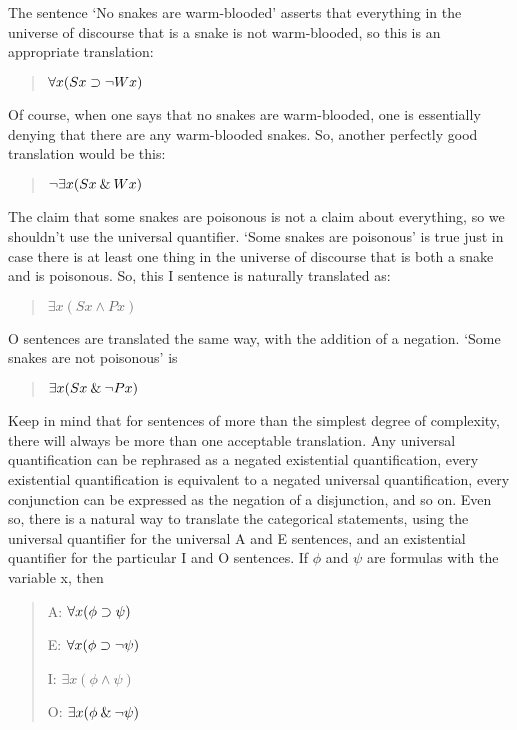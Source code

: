 \documentclass[../logic-text.tex]{subfiles}
\begin{document}
The sentence \enquote*{No snakes are warm-blooded} asserts that everything in the universe of discourse that is a snake is not warm-blooded, so this is an appropriate translation:


\begin{quote}
  \(\forall x(Sx \supset \neg Wx)\)
\end{quote}

Of course, when one says that no snakes are warm-blooded, one is essentially denying that there are any warm-blooded snakes.
So, another perfectly good translation would be this:

\begin{quote}
  \(\neg \exists x( Sx \mathbin{\&} Wx)\)
\end{quote}

The claim that some snakes are poisonous is not a claim about everything, so we shouldn't use the universal quantifier.
\enquote*{Some snakes are poisonous} is true just in case there is at least one thing in the universe of discourse that is both a snake and is poisonous.
So, this I sentence is naturally translated as:

\begin{quote}
  \(\exists x(Sx \land Px)\)
\end{quote}

\noindent O sentences are translated the same way, with the addition of a negation.
\enquote*{Some snakes are not poisonous} is

\begin{quote}
  \(\exists x(Sx \mathbin{\&} \neg Px)\)
\end{quote}

Keep in mind that for sentences of more than the simplest degree of complexity, there will always be more than one acceptable translation.
Any universal quantification can be rephrased as a negated existential quantification, every existential quantification is equivalent to a negated universal quantification, every conjunction can be expressed as the negation of a disjunction, and so on.
Even so, there is a natural way to translate the categorical statements, using the universal quantifier for the universal A and E sentences, and an existential quantifier for the particular I and O sentences.
If \(\phi\) and \(\psi\) are formulas with the variable x, then

\begin{quote}
  A: \(\forall x(\phi \supset \psi)\)

  E: \(\forall x(\phi \supset \neg \psi)\)

  I: \(\exists x(\phi \land \psi)\)

  O: \(\exists x(\phi \mathbin{\&} \neg \psi)\)
\end{quote}
\end{document}
